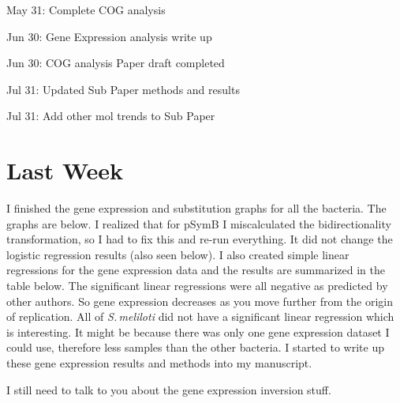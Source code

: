 \documentclass[12pt]{article}
\newcommand{\smel}{\textit{S.\,meliloti}\xspace}
\newcommand{\pb}{pSymB\xspace}
\begin{document}
	May 31:	Complete COG analysis
	
	Jun 30:	Gene Expression analysis write up
	
	Jun 30:	COG analysis Paper draft completed
	
	Jul 31:	Updated Sub Paper methods and results
	
	Jul 31: Add other mol trends to Sub Paper
	
\section*{Last Week}
I finished the gene expression and substitution graphs for all the bacteria. The graphs are below.
I realized that for \pb I miscalculated the bidirectionality transformation, so I had to fix this and re-run everything.
It did not change the logistic regression results (also seen below).
I also created simple linear regressions for the gene expression data and the results are summarized in the table below.
The significant linear regressions were all negative as predicted by other authors.
So gene expression decreases as you move further from the origin of replication.
All of \smel did not have a significant linear regression which is interesting. It might be because there was only one gene expression dataset I could use, therefore less samples than the other bacteria.
I started to write up these gene expression results and methods into my manuscript.

I still need to talk to you about the gene expression inversion stuff.
\end{document}
